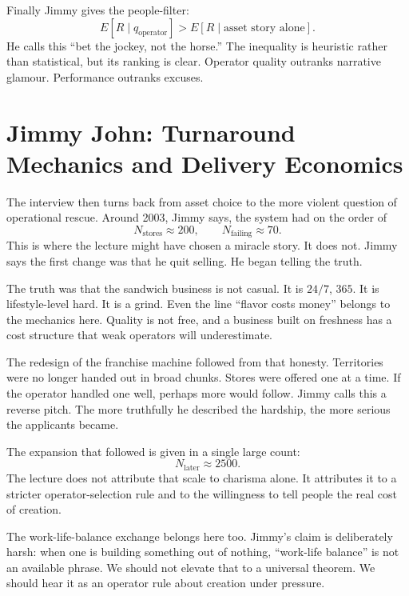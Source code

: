 Finally Jimmy gives the people-filter:
\begin{equation}
E[R\mid q_{\mathrm{operator}}] > E[R\mid \text{asset story alone}].
\end{equation}
He calls this ``bet the jockey, not the horse.'' The inequality is heuristic rather than statistical, but its ranking is clear. Operator quality outranks narrative glamour. Performance outranks excuses.

\section{Jimmy John: Turnaround Mechanics and Delivery Economics}

The interview then turns back from asset choice to the more violent question of operational rescue. Around 2003, Jimmy says, the system had on the order of
\begin{equation}
N_{\mathrm{stores}}\approx 200,\qquad N_{\mathrm{failing}}\approx 70.
\end{equation}
This is where the lecture might have chosen a miracle story. It does not. Jimmy says the first change was that he quit selling. He began telling the truth.

The truth was that the sandwich business is not casual. It is \(24/7\), \(365\). It is lifestyle-level hard. It is a grind. Even the line ``flavor costs money'' belongs to the mechanics here. Quality is not free, and a business built on freshness has a cost structure that weak operators will underestimate.

The redesign of the franchise machine followed from that honesty. Territories were no longer handed out in broad chunks. Stores were offered one at a time. If the operator handled one well, perhaps more would follow. Jimmy calls this a reverse pitch. The more truthfully he described the hardship, the more serious the applicants became.

The expansion that followed is given in a single large count:
\begin{equation}
N_{\mathrm{later}}\approx 2500.
\end{equation}
The lecture does not attribute that scale to charisma alone. It attributes it to a stricter operator-selection rule and to the willingness to tell people the real cost of creation.

The work-life-balance exchange belongs here too. Jimmy's claim is deliberately harsh: when one is building something out of nothing, ``work-life balance'' is not an available phrase. We should not elevate that to a universal theorem. We should hear it as an operator rule about creation under pressure.

